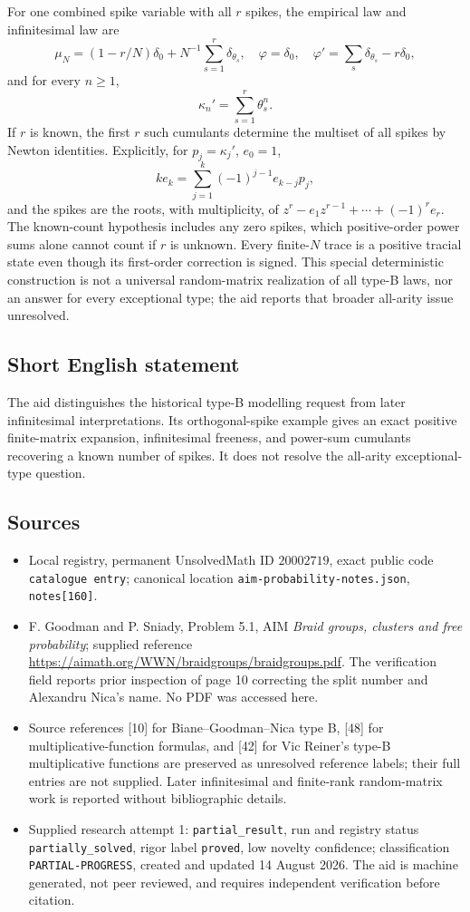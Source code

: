 \documentclass[11pt]{article}
\begin{document}
For one combined spike variable with all \(r\) spikes, the empirical law and infinitesimal law are
\[
 \mu_N=(1-r/N)\delta_0+N^{-1}\sum_{s=1}^r\delta_{\theta_s},\quad
 \varphi=\delta_0,\quad\varphi'=\sum_s\delta_{\theta_s}-r\delta_0,
\]
and for every \(n\ge1\),
\[
 \kappa_n'=\sum_{s=1}^r\theta_s^n.
\]
If \(r\) is known, the first \(r\) such cumulants determine the multiset of all spikes by Newton identities. Explicitly, for \(p_j=\kappa_j'\), \(e_0=1\),
\[
 ke_k=\sum_{j=1}^k(-1)^{j-1}e_{k-j}p_j,
\]
and the spikes are the roots, with multiplicity, of \(z^r-e_1z^{r-1}+\cdots+(-1)^re_r\). The known-count hypothesis includes any zero spikes, which positive-order power sums alone cannot count if \(r\) is unknown. Every finite-\(N\) trace is a positive tracial state even though its first-order correction is signed. This special deterministic construction is not a universal random-matrix realization of all type-B laws, nor an answer for every exceptional type; the aid reports that broader all-arity issue unresolved.
\subsection{Short English statement}
The aid distinguishes the historical type-B modelling request from later infinitesimal interpretations. Its orthogonal-spike example gives an exact positive finite-matrix expansion, infinitesimal freeness, and power-sum cumulants recovering a known number of spikes. It does not resolve the all-arity exceptional-type question.
\subsection{Sources}
\begin{itemize}
\item Local registry, permanent UnsolvedMath ID \(20002719\), exact public code \texttt{catalogue entry}; canonical location \texttt{aim-probability-notes.json}, \texttt{notes[160]}.
\item F. Goodman and P. Sniady, Problem 5.1, AIM \emph{Braid groups, clusters and free probability}; supplied reference \url{https://aimath.org/WWN/braidgroups/braidgroups.pdf}. The verification field reports prior inspection of page 10 correcting the split number and Alexandru Nica's name. No PDF was accessed here.
\item Source references [10] for Biane--Goodman--Nica type B, [48] for multiplicative-function formulas, and [42] for Vic Reiner's type-B multiplicative functions are preserved as unresolved reference labels; their full entries are not supplied. Later infinitesimal and finite-rank random-matrix work is reported without bibliographic details.
\item Supplied research attempt 1: \texttt{partial\_result}, run and registry status \texttt{partially\_solved}, rigor label \texttt{proved}, low novelty confidence; classification \texttt{PARTIAL-PROGRESS}, created and updated 14 August 2026. The aid is machine generated, not peer reviewed, and requires independent verification before citation.
\end{itemize}
\end{document}
